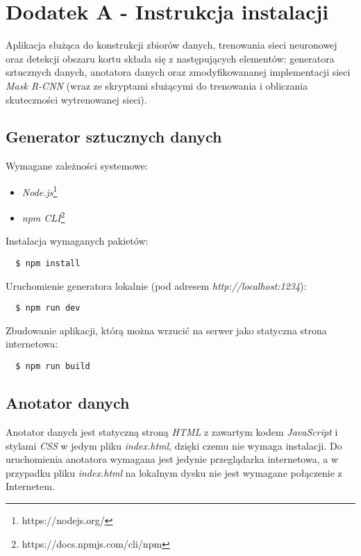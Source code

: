 \chapter*{Dodatek A - Instrukcja instalacji}
\label{sec:instrukcja-instalacji}

Aplikacja służąca do konstrukcji zbiorów danych, trenowania sieci neuronowej oraz detekcji obszaru kortu składa się z następujących elementów: generatora sztucznych danych, anotatora danych oraz zmodyfikowananej implementacji sieci \textit{Mask R-CNN} \cite{matterport-mask-rcnn} (wraz ze skryptami służącymi do trenowania i obliczania skuteczności wytrenowanej sieci).

\section*{Generator sztucznych danych}

Wymagane zależności systemowe:

\begin{itemize}
  \item \textit{Node.js}\footnote{https://nodejs.org/}
  \item \textit{npm CLI}\footnote{https://docs.npmjs.com/cli/npm}
\end{itemize}

Instalacja wymaganych pakietów:

\begin{verbatim}
  $ npm install
\end{verbatim}

Uruchomienie generatora lokalnie (pod adresem \textit{http://localhost:1234}):

\begin{verbatim}
  $ npm run dev
\end{verbatim}

Zbudowanie aplikacji, którą można wrzucić na serwer jako statyczna strona internetowa:

\begin{verbatim}
  $ npm run build
\end{verbatim}

\section*{Anotator danych}
Anotator danych jest statyczną stroną \textit{HTML} z zawartym kodem \textit{JavaScript} i stylami \textit{CSS} w jedym pliku \textit{index.html}, dzięki czemu nie wymaga instalacji. Do uruchomienia anotatora wymagana jest jedynie przeglądarka internetowa, a w przypadku pliku \textit{index.html} na lokalnym dysku nie jest wymagane połączenie z Internetem.

